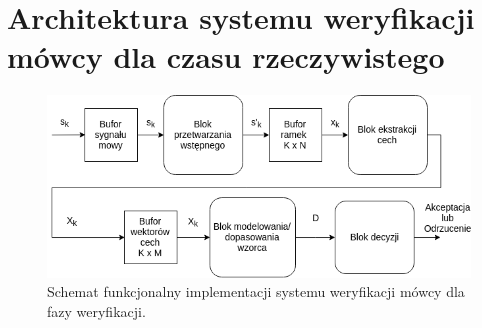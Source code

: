\section{Architektura systemu weryfikacji mówcy dla czasu rzeczywistego}

\begin{figure}[ht!]
  \centering
    \includegraphics[width=1\textwidth]{./overallrt.png}
    \caption{\label{fig:fundiagverif} Schemat funkcjonalny implementacji systemu weryfikacji mówcy dla fazy weryfikacji.}
\end{figure}
